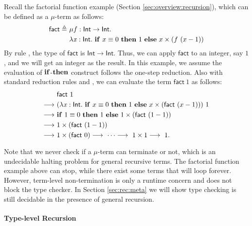Recall the factorial function example (Section
\ref{sec:overview:recursion}), which
can be defined as a $ \mu $-term as follows:
\begin{align*}
    \mathsf{fact}  \triangleq ~  & \mu  f : \mathsf{Int}  \rightarrow  \mathsf{Int} . \\ &\lambda  \mathit{x}  :  \mathsf{Int}  .  ~\mathbf{if}~x  \equiv 0~\mathbf{then}~1~\mathbf{else}~x \times (f~(x
    - 1))
\end{align*}
By rule , the type of $\mathsf{fact}$ is $\mathsf{Int}  \rightarrow  \mathsf{Int}$. Thus, we can apply $\mathsf{fact}$ to an integer, say $1$,
and we will get an integer as the result. In this example, we assume
the evaluation of $\mathbf{if}$-$\mathbf{then}$ construct follows the one-step
reduction. Also with standard reduction rules  and
, we can evaluate the term $\mathsf{fact}~1$ as
follows:
\begin{align*}
    &\mathsf{fact}~1 \\  \longrightarrow ~& (\lambda  \mathit{x}  :  \mathsf{Int}  .  ~\mathbf{if}~x
   \equiv 0~\mathbf{then}~1~\mathbf{else}~x \times (\mathsf{fact}~(x - 1)))~1
  \\  \longrightarrow ~ & \mathbf{if}~1  \equiv 0~\mathbf{then}~1~\mathbf{else}~1 \times
  (\mathsf{fact}~(1 - 1)) \\  \longrightarrow ~& 1 \times (\mathsf{fact}~(1-1))
  \\  \longrightarrow ~& 1 \times (\mathsf{fact}~0)  \longrightarrow ~ \dots  \longrightarrow ~ 1 \times
  1  \longrightarrow ~ 1. 
\end{align*}

Note that we never check if a $\mu$-term can terminate or not, which
is an undecidable halting problem for general recursive terms. The
factorial function example above can stop, while there exist some
terms that will loop forever. However, term-level non-termination is
only a runtime concern and does not block the type checker. In Section
\ref{sec:rec:meta} we will show type checking \name is still decidable
in the presence of general recursion.

\paragraph{Type-level Recursion}


